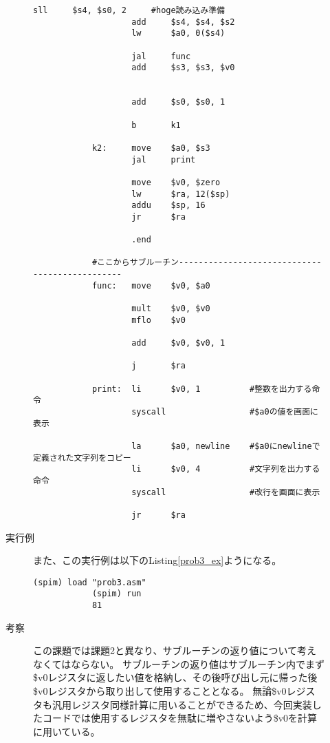 \documentclass{jsarticle}
\begin{document}
\begin{description}
\begin{description}
\begin{lstlisting}[caption=課題3のソースコード, label=prob3]
                    sll     $s4, $s0, 2     #hoge読み込み準備
                    add     $s4, $s4, $s2
                    lw      $a0, 0($s4)

                    jal     func
                    add     $s3, $s3, $v0


                    add     $s0, $s0, 1

                    b       k1

            k2:     move    $a0, $s3
                    jal     print

                    move    $v0, $zero
                    lw      $ra, 12($sp)
                    addu    $sp, 16
                    jr      $ra

                    .end

            #ここからサブルーチン-----------------------------------------------
            func:   move    $v0, $a0

                    mult    $v0, $v0
                    mflo    $v0

                    add     $v0, $v0, 1

                    j       $ra

            print:  li      $v0, 1          #整数を出力する命令
                    syscall                 #$a0の値を画面に表示

                    la      $a0, newline    #$a0にnewlineで定義された文字列をコピー
                    li      $v0, 4          #文字列を出力する命令
                    syscall                 #改行を画面に表示

                    jr      $ra
            \end{lstlisting}

            \item[実行例]
            また、この実行例は以下のListing\ref{prob3_ex}ようになる。
            \begin{lstlisting}[caption=課題3の実行例, label=prob3_ex]
            (spim) load "prob3.asm"
            (spim) run
            81
            \end{lstlisting}

            \item[考察]
            この課題では課題2と異なり、サブルーチンの返り値について考えなくてはならない。
            サブルーチンの返り値はサブルーチン内でまず\$v0レジスタに返したい値を格納し、その後呼び出し元に帰った後\$v0レジスタから取り出して使用することとなる。
            無論\$v0レジスタも汎用レジスタ同様計算に用いることができるため、今回実装したコードでは使用するレジスタを無駄に増やさないよう\$v0を計算に用いている。
            \\
          \end{description}


\end{description}
\end{document}
